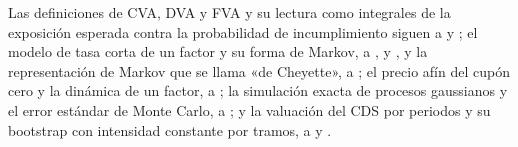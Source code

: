 Las definiciones de CVA, DVA y FVA y su lectura como integrales de la exposición esperada contra la probabilidad de
incumplimiento siguen a \citet{gregory2015} y \citet{brigo2013}; el modelo de tasa corta de un factor y su forma de Markov, a
\citet{hull1990}, \citet{ritchken1995} y \citet{andersen2010}, y la representación de Markov que se llama «de Cheyette», a \citet{cheyette2001}; el precio afín del cupón cero y la dinámica de un factor, a \citet{brigo2006}; la
simulación exacta de procesos gaussianos y el error estándar de Monte Carlo, a \citet{glasserman2003}; y la valuación del CDS por
periodos y su bootstrap con intensidad constante por tramos, a \citet{hull2000} y \citet{okane2008}.
